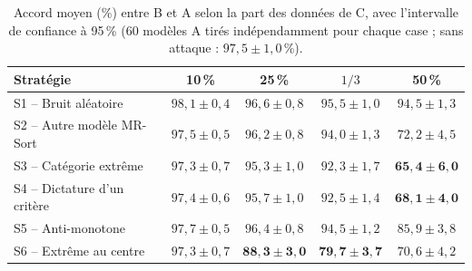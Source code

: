 \documentclass[11pt,a4paper]{article}
\begin{document}
\begin{table}[h]
\centering
\begin{tabularx}{\textwidth}{>{\raggedright\arraybackslash}p{4.6cm}CCCC}
\toprule
Stratégie & 10\,\% & 25\,\% & $1/3$ & 50\,\% \\
\midrule
S1 -- Bruit aléatoire         & $98{,}1 \pm 0{,}4$ & $96{,}6 \pm 0{,}8$ & $95{,}5 \pm 1{,}0$ & $94{,}5 \pm 1{,}3$ \\
S2 -- Autre modèle MR-Sort    & $97{,}5 \pm 0{,}5$ & $96{,}2 \pm 0{,}8$ & $94{,}0 \pm 1{,}3$ & $72{,}2 \pm 4{,}5$ \\
S3 -- Catégorie extrême       & $97{,}3 \pm 0{,}7$ & $95{,}3 \pm 1{,}0$ & $92{,}3 \pm 1{,}7$ & $\mathbf{65{,}4 \pm 6{,}0}$ \\
S4 -- Dictature d'un critère  & $97{,}4 \pm 0{,}6$ & $95{,}7 \pm 1{,}0$ & $92{,}5 \pm 1{,}4$ & $\mathbf{68{,}1 \pm 4{,}0}$ \\
S5 -- Anti-monotone           & $97{,}7 \pm 0{,}5$ & $96{,}4 \pm 0{,}8$ & $94{,}5 \pm 1{,}2$ & $85{,}9 \pm 3{,}8$ \\
S6 -- Extrême au centre       & $97{,}3 \pm 0{,}7$ & $\mathbf{88{,}3 \pm 3{,}0}$ & $\mathbf{79{,}7 \pm 3{,}7}$ & $70{,}6 \pm 4{,}2$ \\
\bottomrule
\end{tabularx}
\caption{Accord moyen (\%) entre B et A selon la part des données de C, avec l'intervalle de confiance à 95\,\%
(60 modèles A tirés indépendamment pour chaque case ; sans attaque : $97{,}5 \pm 1{,}0$\,\%).}
\label{tab:resultats}
\end{table}
\end{document}
